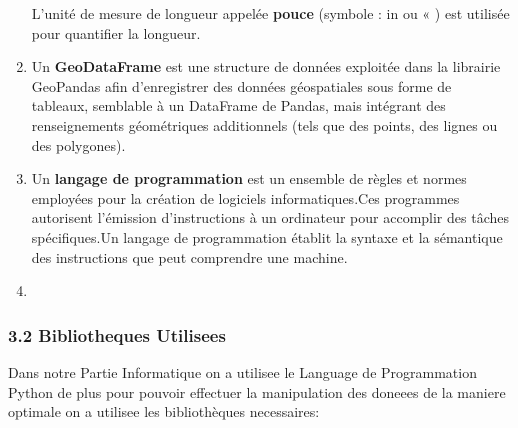 \documentclass[
]{article}
\begin{document}
\begin{enumerate}
  L'unité de mesure de longueur appelée \textbf{pouce} (symbole : in ou
  « ) est utilisée pour quantifier la longueur.
\item
  Un \textbf{GeoDataFrame} est une structure de données exploitée dans
  la librairie GeoPandas afin d'enregistrer des données géospatiales
  sous forme de tableaux, semblable à un DataFrame de Pandas, mais
  intégrant des renseignements géométriques additionnels (tels que des
  points, des lignes ou des polygones).
\item
  Un \textbf{langage de programmation} est un ensemble de règles et
  normes employées pour la création de logiciels informatiques.Ces
  programmes autorisent l'émission d'instructions à un ordinateur pour
  accomplir des tâches spécifiques.Un langage de programmation établit
  la syntaxe et la sémantique des instructions que peut comprendre une
  machine.
\item
\end{enumerate}

\subsubsection{3.2 Bibliotheques
Utilisees}\label{bibliotheques-utilisees}

Dans notre Partie Informatique on a utilisee le Language de
Programmation Python de plus pour pouvoir effectuer la manipulation des
doneees de la maniere optimale on a utilisee les bibliothèques
necessaires:
\end{document}
